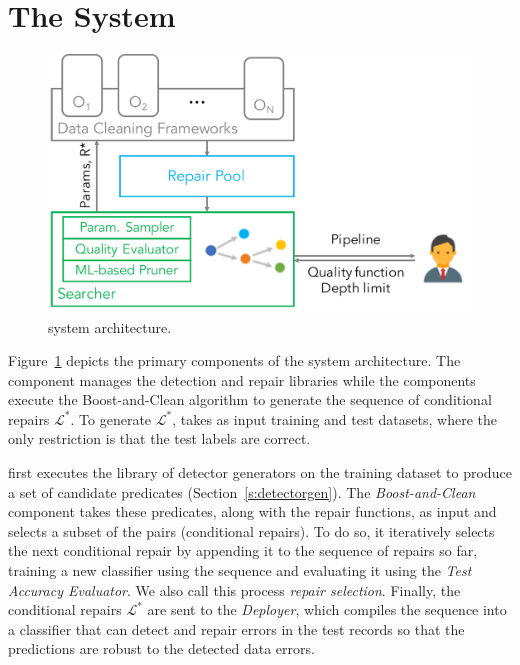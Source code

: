 \section{The \sys System}\label{s:arch}
 
\begin{figure}[t]
\centering
\includegraphics[width=\columnwidth]{figures/arch.pdf}
\caption{\sys system architecture.}
\label{f:arch}
\end{figure}

Figure~\ref{f:arch} depicts the primary components of the system architecture. The  component manages the detection and repair libraries while the  components execute the Boost-and-Clean algorithm to generate the sequence of conditional repairs $\mathcal{L}^*$.  To generate $\mathcal{L}^*$, \sys takes as input training and test datasets, where the only restriction is that the test labels are correct. 

\sys first executes the library of detector generators on the training dataset to produce a set of candidate predicates (Section~\ref{s:detectorgen}).    The {\it Boost-and-Clean} component takes these predicates, along with the repair functions, as input and selects a subset of the pairs (conditional repairs).  To do so, it iteratively selects the next conditional repair by appending it to the sequence of repairs so far, training a new classifier using the sequence and evaluating it using the {\it Test Accuracy Evaluator}.  We also call this process {\it repair selection}.  Finally, the conditional repairs $\mathcal{L}^*$ are sent to the {\it Deployer}, which compiles the sequence into a  classifier that can detect and repair errors in the test records so that the predictions are robust to the detected data errors.  


